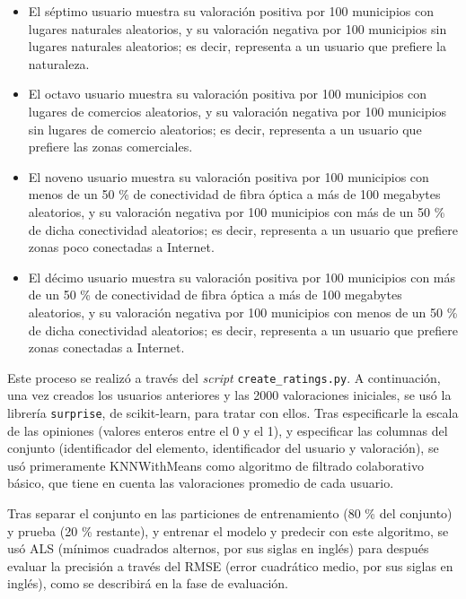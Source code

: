 \begin{itemize}
    \item El séptimo usuario muestra su valoración positiva por 100 municipios con lugares naturales aleatorios, y su valoración negativa por 100 municipios sin lugares naturales aleatorios; es decir, representa a un usuario que prefiere la naturaleza.

    \item El octavo usuario muestra su valoración positiva por 100 municipios con lugares de comercios aleatorios, y su valoración negativa por 100 municipios sin lugares de comercio aleatorios; es decir, representa a un usuario que prefiere las zonas comerciales.

    \item El noveno usuario muestra su valoración positiva por 100 municipios con menos de un 50 \% de conectividad de fibra óptica a más de 100 megabytes aleatorios, y su valoración negativa por 100 municipios con más de un 50 \% de dicha conectividad aleatorios; es decir, representa a un usuario que prefiere zonas poco conectadas a Internet.

    \item El décimo usuario muestra su valoración positiva por 100 municipios con más de un 50 \% de conectividad de fibra óptica a más de 100 megabytes aleatorios, y su valoración negativa por 100 municipios con menos de un 50 \% de dicha conectividad aleatorios; es decir, representa a un usuario que prefiere zonas conectadas a Internet.

\end{itemize}

Este proceso se realizó a través del \textit{script} \texttt{create\_ratings.py}. A continuación, una vez creados los usuarios anteriores y las 2000 valoraciones iniciales, se usó la librería \texttt{surprise}, de scikit-learn, para tratar con ellos. Tras especificarle la escala de las opiniones (valores enteros entre el 0 y el 1), y especificar las columnas del conjunto (identificador del elemento, identificador del usuario y valoración), se usó primeramente KNNWithMeans \cite{scikit_surprise} como algoritmo de filtrado colaborativo básico, que tiene en cuenta las valoraciones promedio de cada usuario.

Tras separar el conjunto en las particiones de entrenamiento (80 \% del conjunto) y prueba (20 \% restante), y entrenar el modelo y predecir con este algoritmo, se usó ALS (mínimos cuadrados alternos, por sus siglas en inglés) para después evaluar la precisión a través del RMSE (error cuadrático medio, por sus siglas en inglés), como se describirá en la fase de evaluación.

